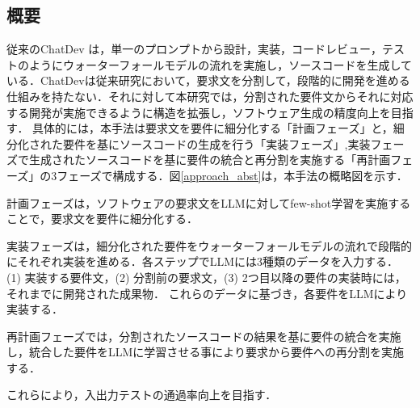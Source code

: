 \documentclass[submit,techrep,noauthor]{ipsj}
\begin{document}
\subsection{概要}
従来のChatDev\cite{qian-etal-2024-chatdev} は，単一のプロンプトから設計，実装，コードレビュー，テストのようにウォーターフォールモデルの流れを実施し，ソースコードを生成している．ChatDevは従来研究\cite{tosem}において，要求文を分割して，段階的に開発を進める仕組みを持たない．それに対して本研究では，分割された要件文からそれに対応する開発が実施できるように構造を拡張し，ソフトウェア生成の精度向上を目指す．
具体的には，本手法は要求文を要件に細分化する「計画フェーズ」と，細分化された要件を基にソースコードの生成を行う「実装フェーズ」,実装フェーズで生成されたソースコードを基に要件の統合と再分割を実施する「再計画フェーズ」の3フェーズで構成する．図\ref{approach_abst}は，本手法の概略図を示す．

計画フェーズは，ソフトウェアの要求文をLLMに対してfew-shot学習を実施することで，要求文を要件に細分化する．

実装フェーズは，細分化された要件をウォーターフォールモデルの流れで段階的にそれぞれ実装を進める．各ステップでLLMには3種類のデータを入力する．
(1) 実装する要件文，(2) 分割前の要求文，(3) 2つ目以降の要件の実装時には，それまでに開発された成果物．
これらのデータに基づき，各要件をLLMにより実装する．

再計画フェーズでは，分割されたソースコードの結果を基に要件の統合を実施し，統合した要件をLLMに学習させる事により要求から要件への再分割を実施する．

これらにより，入出力テストの通過率向上を目指す．



\end{document}
